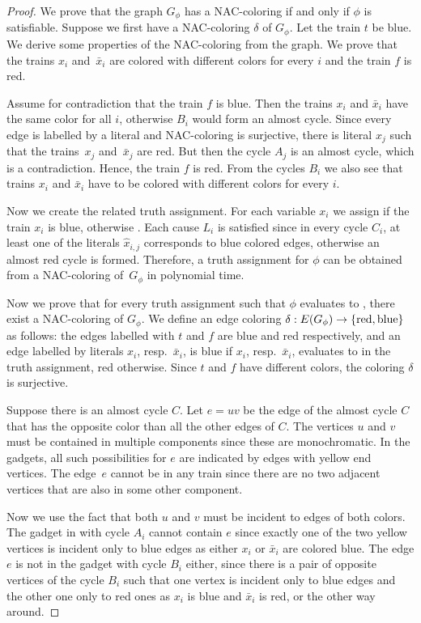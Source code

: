\begin{proof}
	We prove that the graph $G_\phi$ has a NAC-coloring if and only if
	$\phi$ is satisfiable.
	Suppose we first have a NAC-coloring $\delta$ of $G_\phi$.
	Let the train $t$ be blue.
	We derive some properties of the NAC-coloring from the graph.
	We prove that the trains $x_i$ and~$\bar{x}_i$
	are colored with different colors for every $i$
	and the train $f$ is red.

	Assume for contradiction that the train $f$ is blue.
	Then the trains $x_i$ and $\bar{x}_i$ have the same color for all $i$,
	otherwise $B_i$ would form an almost cycle.
	Since every edge is labelled by a literal and NAC-coloring is surjective,
	there is literal $x_j$ such that the trains~$x_j$ and~$\bar{x}_j$ are red.
	But then the cycle $A_j$ is an almost cycle, which is a contradiction.
	Hence, the train $f$ is red.
	From the cycles $B_i$ we also see
	that trains $x_i$ and $\bar{x}_i$ have to be colored with different colors
	for every $i$.

	Now we create the related truth assignment.
	For each variable $x_i$ we assign \true{} if
	the train $x_i$ is blue,
	otherwise \false{}.
	Each cause $L_i$ is satisfied since
	in every cycle $C_i$, at least one of
	the literals $\hat{x}_{i,j}$ corresponds to blue colored
	edges, otherwise an almost red cycle is formed.
	Therefore, a truth assignment for $\phi$ can be obtained
	from a NAC-coloring of~$G_\phi$ in polynomial time.

	Now we prove that for every truth assignment such that $\phi$ evaluates to \true{}, there exist
	a NAC-coloring of $G_\phi$. We define an edge coloring
	$\delta: E(G_\phi) \to \{\text{red}, \text{blue}\}$ as follows:
	the edges labelled with $t$ and $f$ are blue and red respectively,
	and an edge labelled by literals $x_i$, resp.\ $\bar{x}_i$, is blue
	if $x_i$, resp.\ $\bar{x}_i$, evaluates to \true{} in the truth assignment, red otherwise.
	Since $t$ and $f$ have different colors,
	the coloring $\delta$ is surjective.

	Suppose there is an almost cycle $C$.
	Let $e=uv$ be the edge of the almost cycle $C$ that has the opposite color
	than all the other edges of $C$.
	The vertices $u$ and $v$ must be contained in multiple \trcon{} components
	since these are monochromatic.
	In the gadgets, all such possibilities for $e$ are indicated by edges with yellow end vertices.
	The edge~$e$ cannot be in any train since there are no two adjacent vertices that are also
	in some other \trcon{} component.

	Now we use the fact that both $u$ and $v$ must be incident to edges of both colors.
	The gadget in  with cycle $A_i$
	cannot contain $e$ since exactly one of the two yellow vertices is incident only to blue edges
	as either $x_i$ or $\bar{x}_i$ are colored blue.
	The edge $e$ is not in the gadget with cycle $B_i$ either,
	since there is a pair of opposite vertices of the cycle $B_i$
	such that one vertex is incident only to blue edges and the other one only to red ones
	as $x_i$ is blue and $\bar{x}_i$ is red, or the other way around.


\end{proof}

